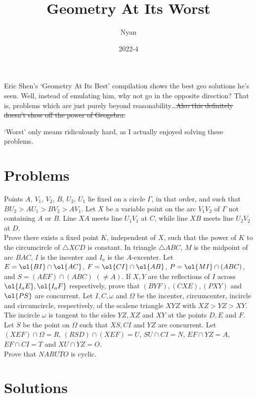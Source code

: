 \documentclass{seto}
\title{Geometry At Its Worst}
\author{Nyan}
\date{2022-4}
\begin{document}
\maketitle
Eric Shen's `Geometry At Its Best' compilation shows the best geo solutions he's seen. 
Well, instead of emulating him, why not go in the opposite direction? That is, problems which are 
just purely beyond reasonability\dots \st{Also this definitely doesn't show off the power of Geogebra.}
\begin{remark}[Disclaimer]
    `Worst' only means ridiculously hard, as I actually enjoyed solving these problems.
\end{remark}
\toc
\setcounter{section}{-1}
\section{Problems}
 Points $A$, $V_1$, $V_2$, $B$, $U_2$, $U_1$ lie fixed
on a circle $\Gamma$, in that order, and such that $BU_2 > AU_1 > BV_2 > AV_1$.
Let $X$ be a variable point on the arc $V_1 V_2$ of $\Gamma$ not containing $A$
or $B$. Line $XA$ meets line $U_1 V_1$ at $C$, while line $XB$ meets line $U_2
V_2$ at $D$.\\[4pt] 
Prove there exists a fixed point $K$, independent of $X$, such that the power of
$K$ to the circumcircle of $\triangle XCD$ is constant.
\exercise[DIMO 2022/6] In triangle $\triangle ABC$, $M$ is the midpoint of arc
$BAC$, $I$ is the incenter and $I_a$ is the $A$-excenter. 
Let $E=\ol{BI}\cap\ol{AC}$, $F=\ol{CI}\cap\ol{AB}$, $P=\ol{MI}\cap(ABC)$, and $S=(AEF)\cap(ABC)$ $(\neq A)$. 
If $X,Y$ are the reflections of $I$ across $\ol{I_aE},\ol{I_aF}$ respectively, prove that $(BYF), (CXE), (PXY)$ and $\ol{PS}$ are concurrent. 
 Let $I, C, \omega$ and $\Omega$
be the incenter, circumcenter, incircle and circumcircle, respectively, of the
scalene triangle  $XYZ$ with $XZ > YZ > XY$. The incircle $\omega$ is tangent to
the sides $YZ, XZ$ and $XY$ at the points $D, E$ and $F$. Let $S$ be the point
on $\Omega$ such that $XS, CI$ and $YZ$ are concurrent. Let $(XEF) \cap \Omega =
R$, $(RSD) \cap (XEF) = U$, $SU \cap CI = N$, $EF \cap YZ = A$, $EF \cap CI = T$
and $XU \cap YZ = O$.\\[4pt]
Prove that $NARUTO$ is cyclic.

\newpage
\section{Solutions}
\end{document}
